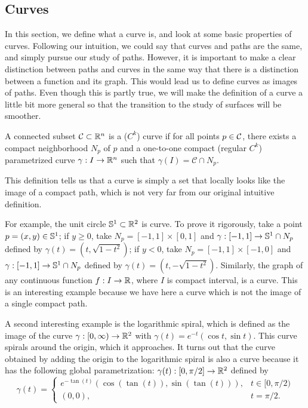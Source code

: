 \subsection{Curves}

In this section, we define what a curve is, and look at some basic properties of curves. Following our intuition, we could say that curves and paths are the same, and simply pursue our study of paths. However, it is important to make a clear distinction between paths and curves in the same way that there is a distinction between a function and its graph. This would lead us to define curves as images of paths. Even though this is partly true, we will make the definition of a curve a little bit more general so that the transition to the study of surfaces will be smoother.

\begin{definition}[Curve]
    A connected subset $\C \subset \R^n$ is a ($C^k$) curve if for all points $p \in \C$, there exists a compact neighborhood $N_p$ of $p$ and a one-to-one compact (regular $C^k$) parametrized curve $\gamma : I \to \R^n$ such that $\gamma(I) = \mathcal{C} \cap N_p$.
\end{definition}

This definition tells us that a curve is simply a set that locally looks like the image of a compact path, which is not very far from our original intuitive definition.

For example, the unit circle $\S^1 \subset \R^2$ is curve. To prove it rigorously, take a point $p = (x,y) \in \S^1$; if $y \geq 0$, take $N_p = [-1,1]\times [0, 1]$ and $\gamma : [-1, 1] \to \S^1 \cap N_p$ defined by $\gamma(t) = (t, \sqrt{1 - t^2})$; if $y < 0$, take $N_p = [-1,1]\times [-1, 0]$ and $\gamma : [-1, 1] \to \S^1 \cap N_p$ defined by $\gamma(t) = (t, -\sqrt{1 - t^2})$. Similarly, the graph of any continuous function $f : I \to \R$, where $I$ is compact interval, is a curve. This is an interesting example because we have here a curve which is not the image of a single compact path.

A second interesting example is the logarithmic spiral, which is defined as the image of the curve $\gamma: [0, \infty) \to \R^2$ with $\gamma(t) = e^{-t}(\cos t, \sin t)$. This curve spirals around the origin, which it approaches. It turns out that the curve obtained by adding the origin to the logarithmic spiral is also a curve because it has the following global parametrization: $\gamma(t) : [0, \pi/2] \to \R^2$ defined by
$$\gamma(t) = \begin{cases}
    e^{-\tan(t)}(\cos(\tan(t)), \sin(\tan(t))), & t \in [0, \pi/2)\\
    (0,0), & t = \pi/2.
\end{cases}$$ 

